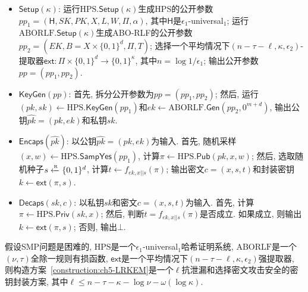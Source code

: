 \begin{construction}\label{construction:ch5-LRKEM}
\begin{itemize} \itemsep 1pt \parskip 0pt \parsep 0pt
\item $\mathsf{Setup}(\kappa)$: 运行$\text{HPS}.\mathsf{Setup}(\kappa)$生成HPS的公开参数$pp_1 = (\mathsf{H}, SK, PK, X, L, W, \Pi, \alpha)$, 其中$\mathsf{H}$是$\epsilon_1$-universal$_1$; 运行$\text{ABORLF}.\mathsf{Setup}(\kappa)$生成ABO-RLF的公开参数$pp_2 = (EK, B = X \times \{0,1\}^d, \Pi, T)$; 选择一个平均情况下$(n - \tau-\ell, \kappa, \epsilon_2)$-提取器$\mathsf{ext}: \Pi \times \{0,1\}^d \rightarrow \{0,1\}^\kappa$, 其中$n = \log 1/\epsilon_1$; 输出公开参数$pp = (pp_1, pp_2)$. 

\item $\mathsf{KeyGen}(pp)$: 首先, 拆分公开参数为$pp = (pp_1, pp_2)$; 然后, 运行$(pk, sk) \leftarrow \text{HPS}.\mathsf{KeyGen}(pp_1)$和$ek \leftarrow \text{ABORLF}.\mathsf{Gen}(pp_2, 0^{m+d})$, 
	输出公钥$\hat{pk} = (pk, ek)$和私钥$sk$.

\item $\mathsf{Encaps}(\hat{pk})$: 以公钥$\hat{pk} = (pk, ek)$为输入. 首先, 随机采样$(x, w) \leftarrow \text{HPS}.\mathsf{SampYes}(pp_1)$, 计算$\pi \leftarrow \text{HPS}.\mathsf{Pub}(pk, x, w)$; 然后, 选取随机种子$s \xleftarrow{\textup{\tiny R}} \{0, 1\}^d$, 计算$t \leftarrow f_{ek,x||s}(\pi)$; 输出密文$c = (x, s, t)$和封装密钥$k \leftarrow \mathsf{ext}(\pi, s)$.

\item $\mathsf{Decaps}(sk, c)$: 以私钥$sk$和密文$c = (x, s, t)$为输入. 首先, 计算$\pi \leftarrow \text{HPS}.\mathsf{Priv}(sk, x)$; 然后, 判断$t = f_{ek,x||s}(\pi)$是否成立. 如果成立, 则输出$k \leftarrow \mathsf{ext}(\pi, s)$; 否则, 输出$\bot$. 
\end{itemize}
\end{construction}

\begin{theorem}\label{theorem:ch5-LRCCA-KEM}
假设SMP问题是困难的, $\text{HPS}$是一个$\epsilon_1$-universal$_1$哈希证明系统, 
$\text{ABORLF}$是一个$(\nu, \tau)$全除一规则有损函数, $\mathsf{ext}$是一个平均情况下$(n-\tau-\ell, \kappa, \epsilon_2)$强提取器, 则构造方案~\ref{construction:ch5-LRKEM}是一个$\ell$抗泄漏和选择密文攻击安全的密钥封装方案, 其中$\ell \leq n - \tau - \kappa - \log \nu - \omega(\log \kappa)$.
\end{theorem}


